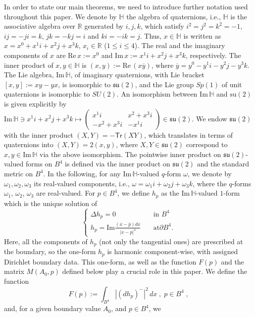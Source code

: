 \documentclass[11pt]{article}
\numberwithin{equation}{section} \setlength{\topmargin}{-35pt}
\newcommand{\R}{\mathbb{R}}
\newcommand{\HH}{\mathbb{H}}
\newcommand{\tr}{\mathsf{Tr}}
\begin{document}
\medskip
In order to state our main theorems, we need to introduce further
notation
 used throughout this paper.
 We denote by $\HH$ the algebra of quaternions, i.e., $\HH$ is the
associative algebra over $\R$ generated by $i,j,k$, which satisfy
$i^2=j^2=k^2=-1$, $ij=-ji=k$, $jk=-kj=i$ and $ki=-ik=j$. Thus,
$x\in\HH$ is written as $x=x^0+x^1i+x^2j+x^3k$, $x_i\in\R$ ($1\le
i\le 4$). The real and the imaginary components of $x$ are
$\text{Re}\,x:=x^0$ and $\text{Im}\,x:=x^1i+x^2j+x^3k$,
respectively. The inner product of $x,y\in\HH$ is $(x,y)
:=\text{Re}\, (x\overline{y})$, where
$\overline{y}=y^0-y^1i-y^2j-y^3k$. The Lie algebra,
$\text{Im}\,\HH$, of imaginary quaternions, with Lie bracket $[x,y]
:= xy - yx$, is isomorphic to $\mathfrak{su}(2)$, and the Lie group
$Sp(1)$ of unit quaternions is isomorphic to $SU(2)$. An isomorphism
between $\text{Im}\,\HH$ and $\text{su}(2)$ is given explicitly by
$\text{Im}\,\HH\ni x^1i+x^2j+x^3k\mapsto \begin{pmatrix} x^1i&x^2+x^3i\\
-x^2+x^3i&-x^1i\end{pmatrix}\in\mathfrak{su}(2)$. We endow
$\mathfrak{su}(2)$ with the inner product $(X,Y)=-\tr(XY)$, which
translates in terms of quaternions into $(X,Y)=2(x,y)$, where
$X,Y\in\mathfrak{su}(2)$ correspond to $x,y\in\text{Im}\,\HH$ via
the above isomorphism. The pointwise inner product on
$\mathfrak{su}(2)$-valued forms on $B^4$ is defined via the inner
product on $\mathfrak{su}(2)$ and the standard metric on $B^4$. In
the following, for any $\text{Im}\,\HH$-valued $q$-form $\omega$, we
denote by $\omega_1,\omega_2,\omega_3$ its real-valued components,
i.e., $\omega=\omega_1i+\omega_2j+\omega_3k$, where the $q$-forms
$\omega_1$, $\omega_2$, $\omega_3$ are real-valued. For $p\in B^4$,
we define $h_p$ as the $\text{Im}\,\HH$-valued $1$-form which is the
unique solution of
$$\left\{\begin{array}{ll}
\Delta h_p=0\quad&\mbox{in } B^4\\
h_p=\text{Im}\frac{(\overline{x}-\overline{p})dx}{|x-p|^4}\quad&\mbox{at
} \partial B^4. \end{array}\right.$$ Here, all the components of
$h_p$ (not only the tangential ones) are prescribed at the boundary,
so the one-form $h_p$ is harmonic component-wise, with assigned
Dirichlet boundary data. This one-form, as well as the function
$F(p)$ and the matrix $M(A_0, p)$ defined below play a crucial role
in this paper. We define the function
$$F(p):=\int_{B^4}|(dh_p)^-|^2\,dx\;,\; p\in B^4\;,$$
\noindent and, for a given boundary value $A_0$, and $p\in B^4$, we
\end{document}
